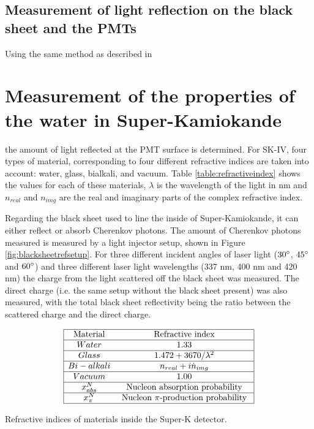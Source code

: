 \subsection{Measurement of light reflection on the black sheet and the PMTs} 

Using the same method as described in \section{Measurement of the properties of the water in Super-Kamiokande} the amount of light reflected at the PMT surface is determined. For SK-IV, four types of material, corresponding to four different refractive indices are taken into account: water, glass, bialkali, and vacuum. Table \ref{table:refractiveindex} shows the values for each of these materials, $\lambda$ is the wavelength of the light in nm and $n_{real}$ and $n_{img}$ are the real and imaginary parts of the complex refractive index.

Regarding the black sheet used to line the inside of Super-Kamiokande, it can either reflect or absorb Cherenkov photons. The amount of Cherenkov photons measured is measured by a light injector setup, shown in Figure \ref{fig:blacksheetrefsetup}. For three different incident angles of laser light ($30 \degree$, $45 \degree$ and $60 \degree$) and three different laser light wavelengths (337 nm, 400 nm and 420 nm) the charge from the light scattered off the black sheet was measured. The direct charge (i.e. the same setup without the black sheet present) was also measured, with the total black sheet reflectivity being the ratio between the scattered charge and the direct charge.

\begin{table}[H]
    $$
    \begin{array}{|cc|}
    \hline \text{Material} & \text{Refractive index} \\
    \hline Water & 1.33 \\
    \hline Glass & 1.472+3670/\lambda^{2} \\
    \hline Bi-alkali & n_{real} + i \dot n_{img} \\
    \hline Vacuum & 1.00 \\
    \hline x_{a b s}^{N} & \text { Nucleon absorption probability }  \\
    \hline x_{\pi}^{N} & \text { Nucleon } \pi \text {-production probability }\\
    \hline

    
    \end{array}
    $$
    \caption{Refractive indices of materials inside the Super-K detector.} 
    \label{table:refractiveindex}
    \end{table}
    

